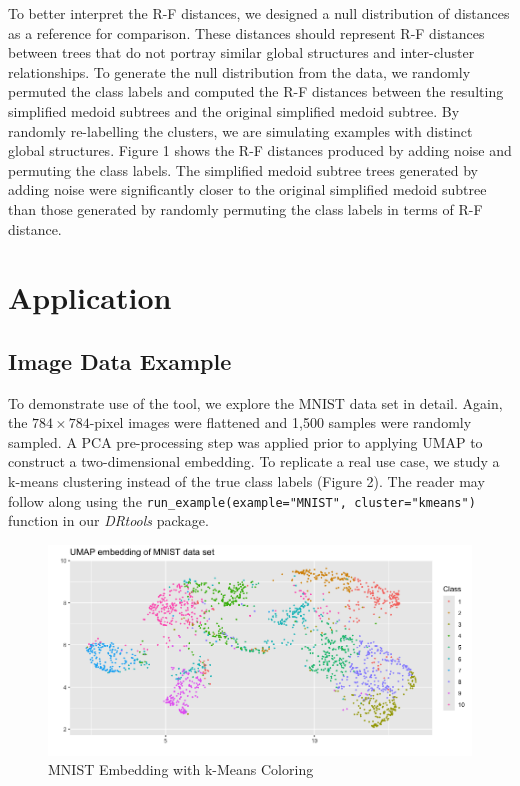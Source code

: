 \documentclass{article}
\begin{document}
To better interpret the R-F distances, we designed a null distribution of distances as a reference for comparison. These distances should represent R-F distances between trees that do not portray similar global structures and inter-cluster relationships. To generate the null distribution from the data, we randomly permuted the class labels and computed the R-F distances between the resulting simplified medoid subtrees and the original simplified medoid subtree. By randomly re-labelling the clusters, we are simulating examples with distinct global structures. Figure 1 shows the R-F distances produced by adding noise and permuting the class labels. The simplified medoid subtree trees generated by adding noise were significantly closer to the original simplified medoid subtree than those generated by randomly permuting the class labels in terms of R-F distance.

\section{Application}

\subsection{Image Data Example}
To demonstrate use of the tool, we explore the MNIST data set in detail. Again, the $784 \times 784$-pixel images were flattened and 1,500 samples were randomly sampled. A PCA pre-processing step was applied prior to applying UMAP \cite{UMAP} to construct a two-dimensional embedding. To replicate a real use case, we study a k-means clustering instead of the true class labels (Figure 2). The reader may follow along using the \texttt{run\_example(example="MNIST", cluster="kmeans")} function in our \textit{DRtools} package.

\renewcommand{\figurename}{Figure}
\renewcommand{\thefigure}{2}
\begin{figure}[!t]
\centering
\includegraphics[scale=0.45]{MNIST kmeans}
\caption{MNIST Embedding with k-Means Coloring}
\end{figure}
\end{document}
